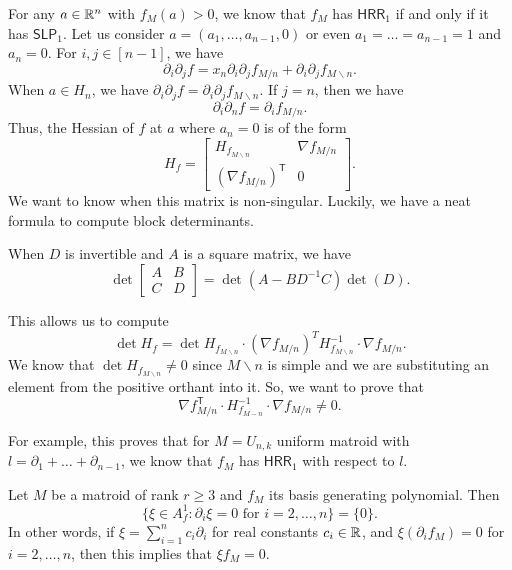 \documentclass[12pt]{article}
\newcommand{\SLP}{\mathsf{SLP}}
\newcommand{\HRR}{\mathsf{HRR}}
\begin{document}
For any $a \in \mathbb{R}^n$ with $f_M(a) > 0$, we know that $f_M$ has $\HRR_1$ if and only if it has $\SLP_1$. Let us consider $a = (a_1, \ldots, a_{n-1}, 0)$ or even $a_1 = \ldots = a_{n-1} = 1$ and $a_n = 0$. For $i, j \in [n-1]$, we have 
\[
	\partial_i \partial_j f = x_n \partial_i \partial_j f_{M / n} + \partial_{i} \partial_j f_{M \backslash n}.
\]
When $a \in H_n$, we have $\partial_i \partial_j f = \partial_i \partial_j f_{M \backslash n}$.  If $j = n$, then we have 
\[
	\partial_i \partial_n f = \partial_i f_{M / n}.
\]
Thus, the Hessian of $f$ at $a$ where $a_n = 0$ is of the form 
\[
	H_f = \begin{bmatrix}
		H_{f_{M \backslash n}} & \nabla f_{M/n} \\
		\left ( \nabla f_{M/n} \right )^{\mathsf{T}} & 0
	\end{bmatrix}.
\]
We want to know when this matrix is non-singular. Luckily, we have a neat formula to compute block determinants. 

\begin{thm} 
	When $D$ is invertible and $A$ is a square matrix, we have
	\[
		\det \begin{bmatrix}
			A & B \\ C & D
		\end{bmatrix} = \det (A - BD^{-1}C) \det (D).
	\]
\end{thm}

This allows us to compute
\[
	\det H_f = \det H_{f_{M \backslash n}} \cdot (\nabla f_{M / n})^T H_{f_{M\backslash n}}^{-1} \cdot \nabla f_{M/n}. 
\]
We know that $\det H_{f_{M\backslash n}} \neq 0$ since $M \backslash n$ is simple and we are substituting an element from the positive orthant into it. So, we want to prove that 
\[
 	\nabla f_{M/n}^\mathsf{T} \cdot H_{f_{M - n}}^{-1} \cdot \nabla f_{M/n} \neq 0.
\]

For example, this proves that for $M = U_{n, k}$ uniform matroid with $l = \partial_1 + \ldots + \partial_{n-1}$, we know that $f_M$ has $\mathsf{HRR}_1$ with respect to $l$. 

\begin{thm}
	Let $M$ be a matroid of rank $r \geq 3$ and $f_M$ its basis generating polynomial. Then 
	\[
		\{\xi \in A_f^1 : \partial_i \xi = 0 \text{ for $i = 2, \ldots, n$}\} = \{0\}.
	\]
	In other words, if $\xi = \sum_{i = 1}^n c_i \partial_i$ for real constants $c_i \in \mathbb{R}$, and $\xi (\partial_i f_M) = 0$ for $i = 2, \ldots, n$, then this implies that $\xi f_M = 0$. 
\end{thm}
\end{document}
